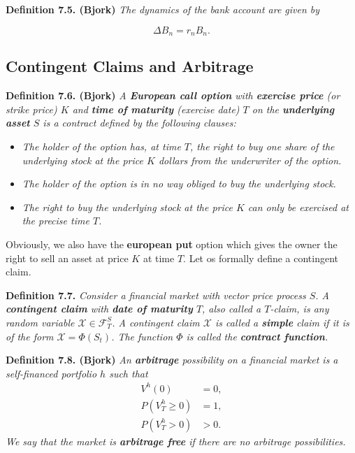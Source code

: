 \documentclass[
]{book}
\providecommand{\tightlist}{%
  \setlength{\itemsep}{0pt}\setlength{\parskip}{0pt}}
\begin{document}
\textbf{Definition 7.5. (Bjork)} \emph{The dynamics of the bank account are given by}

\[
\Delta B_n=r_n B_n.\tag{7.7}
\]

\hypertarget{contingent-claims-and-arbitrage}{%
\subsection{Contingent Claims and Arbitrage}\label{contingent-claims-and-arbitrage}}

\textbf{Definition 7.6. (Bjork)} \emph{A \textbf{European call option} with \textbf{exercise price} (or strike price) \(K\) and \textbf{time of maturity} (exercise date) \(T\) on the \textbf{underlying asset} \(S\) is a contract defined by the following clauses:}

\begin{itemize}
\tightlist
\item
  \emph{The holder of the option has, at time \(T\), the right to buy one share of the underlying stock at the price \(K\) dollars from the underwriter of the option.}
\item
  \emph{The holder of the option is in no way obliged to buy the underlying stock.}
\item
  \emph{The right to buy the underlying stock at the price \(K\) can only be exercised at the precise time \(T\).}
\end{itemize}

Obviously, we also have the \textbf{european put} option which gives the owner the right to sell an asset at price \(K\) at time \(T\). Let os formally define a contingent claim.

\textbf{Definition 7.7.} \emph{Consider a financial market with vector price process \(S\). A \textbf{contingent claim} with \textbf{date of maturity} \(T\), also called a \(T\)-claim, is any random variable \(\mathcal{X}\in\mathcal{F}_T^S\). A contingent claim \(\mathcal{X}\) is called a \textbf{simple} claim if it is of the form \(\mathcal{X} = \Phi(S_t)\). The function \(\Phi\) is called the \textbf{contract function}.}

\textbf{Definition 7.8. (Bjork)} \emph{An \textbf{arbitrage} possibility on a financial market is a self-financed portfolio \(h\) such that}
\begin{align*}
V^h(0)&=0,\tag{7.13}\\
P(V_T^h\ge0)&=1,\tag{7-14}\\
P(V_T^h>0)&>0.\tag{7.15}
\end{align*}
\emph{We say that the market is \textbf{arbitrage free} if there are no arbitrage possibilities.}
\end{document}
